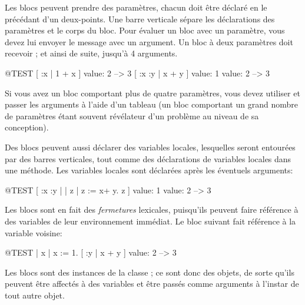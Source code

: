 \documentclass[a4paper,10pt,twoside]{book}
\begin{document}
Les blocs peuvent prendre des param\`etres, chacun doit \^etre
d\'eclar\'e en le précédant d'un deux-points.
Une barre verticale s\'{e}pare les d\'{e}clarations des param\`{e}tres
et le corps du bloc.
Pour \'evaluer un bloc avec un param\`{e}tre, vous devez lui envoyer le message 
  avec un argument.
Un bloc \`{a} deux param\`etres doit recevoir  ; et ainsi de suite, jusqu'\`a 4 arguments.

\begin{code}{@TEST}
[ :x | 1 + x ] value: 2 --> 3
[ :x :y | x + y ] value: 1 value: 2 --> 3
\end{code}

Si vous avez un bloc comportant plus de quatre param\`{e}tres, vous devez utiliser
 et passer les arguments à
l'aide d'un tableau (un bloc comportant un grand nombre de param\`{e}tres étant souvent r\'{e}v\'{e}lateur d'un probl\`{e}me au niveau de sa conception).

Des blocs peuvent aussi d\'{e}clarer des variables locales, lesquelles seront entour\'{e}es par des barres verticales, tout comme des d\'{e}clarations de variables locales dans une m\'{e}thode.
Les variables locales sont d\'{e}clar\'{e}es apr\`{e}s les éventuels
arguments:

\begin{code}{@TEST}
[ :x :y | | z | z := x+ y. z ] value: 1 value: 2 --> 3
\end{code}

Les blocs sont en fait des \emph{fermetures} lexicales, puisqu'ils
peuvent faire r\'ef\'erence \`a des variables de leur environnement
imm\'ediat. Le bloc suivant fait r\'ef\'erence \`a la variable  voisine:

\begin{code}{@TEST}
| x |
x := 1.
[ :y | x + y ] value: 2 --> 3
\end{code}

Les blocs sont des instances de la classe ; ce
sont donc des objets, de sorte qu'ils peuvent \^{e}tre affect\'{e}s
\`{a} des variables et \^{e}tre pass\'{e}s comme arguments \`{a}
l'instar de tout autre objet.
\end{document}
